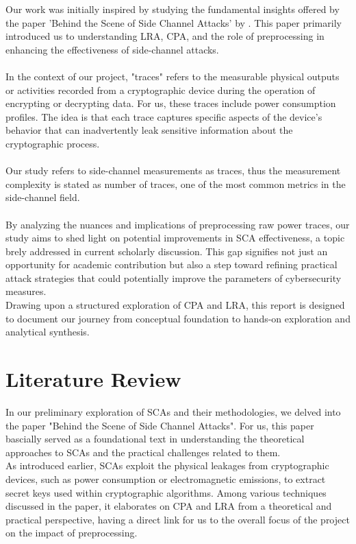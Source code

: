 \documentclass[a4paper,10pt]{article}
\begin{document}
\newline
Our work was initially inspired by studying the fundamental insights offered by the paper 'Behind the Scene of Side Channel Attacks'
by \cite{paper1}. This paper primarily introduced us to understanding LRA, CPA, and the role of preprocessing in enhancing the effectiveness of side-channel attacks.
\\ \\
In the context of our project, "traces" refers to the measurable physical outputs or activities recorded from a cryptographic device during the operation of encrypting or decrypting data.
For us, these traces include power consumption profiles. The idea is that each trace captures specific aspects of the device's behavior that can inadvertently leak sensitive information about the cryptographic process.
\\ \\
Our study refers to side-channel measurements as traces, thus the measurement complexity is stated as number of traces, one of the most common metrics in the side-channel field.
\\ \\
By analyzing the nuances and implications of preprocessing raw power traces, our study aims to shed light on potential improvements in SCA effectiveness, a topic brely addressed in current scholarly discussion. 
This gap signifies not just an opportunity for academic contribution but also a step toward refining practical attack strategies that could potentially improve the parameters of cybersecurity measures.\\
\newline
Drawing upon a structured exploration of CPA and LRA, this report is designed to document our journey from conceptual foundation to hands-on exploration and analytical synthesis.

\section{Literature Review}
In our preliminary exploration of SCAs and their methodologies, we delved into the paper "Behind the Scene of Side Channel Attacks".
For us, this paper bascially served as a foundational text in understanding the theoretical approaches to SCAs and the practical challenges related to them.
\\
\newline
As introduced earlier, SCAs exploit the physical leakages from cryptographic devices, such as power consumption or electromagnetic emissions, to extract secret keys used within cryptographic algorithms. 
Among various techniques discussed in the paper, it elaborates on CPA and LRA from a theoretical and practical perspective, having a direct link for us to the overall focus of the project on the impact of preprocessing.
\end{document}

